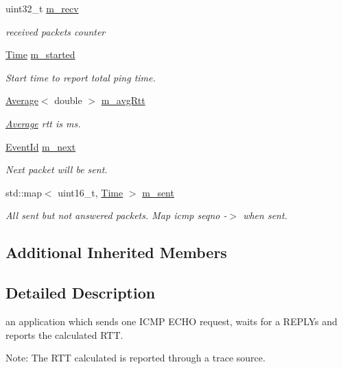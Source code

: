 \begin{DoxyCompactItemize}
uint32\+\_\+t \hyperlink{classns3_1_1V4Ping_a20b535b432481efa2e45d398de3080e1}{m\+\_\+recv}
\begin{DoxyCompactList}\small\item\em received packets counter \end{DoxyCompactList}\item 
\hyperlink{classns3_1_1Time}{Time} \hyperlink{classns3_1_1V4Ping_af7dd3e807bcafb10bb3ce472e9181e8c}{m\+\_\+started}
\begin{DoxyCompactList}\small\item\em Start time to report total ping time. \end{DoxyCompactList}\item 
\hyperlink{classns3_1_1Average}{Average}$<$ double $>$ \hyperlink{classns3_1_1V4Ping_a03550e3b807e5fe961c2289749a45ba9}{m\+\_\+avg\+Rtt}
\begin{DoxyCompactList}\small\item\em \hyperlink{classns3_1_1Average}{Average} rtt is ms. \end{DoxyCompactList}\item 
\hyperlink{classns3_1_1EventId}{Event\+Id} \hyperlink{classns3_1_1V4Ping_a1367294031cf873b968ede49360fda7b}{m\+\_\+next}
\begin{DoxyCompactList}\small\item\em Next packet will be sent. \end{DoxyCompactList}\item 
std\+::map$<$ uint16\+\_\+t, \hyperlink{classns3_1_1Time}{Time} $>$ \hyperlink{classns3_1_1V4Ping_ad26f6eafcdbf6a787900a6c77099ef6e}{m\+\_\+sent}
\begin{DoxyCompactList}\small\item\em All sent but not answered packets. Map icmp seqno -\/$>$ when sent. \end{DoxyCompactList}\end{DoxyCompactItemize}
\subsection*{Additional Inherited Members}


\subsection{Detailed Description}
an application which sends one I\+C\+MP E\+C\+HO request, waits for a R\+E\+P\+L\+Ys and reports the calculated R\+TT. 

Note\+: The R\+TT calculated is reported through a trace source. 


